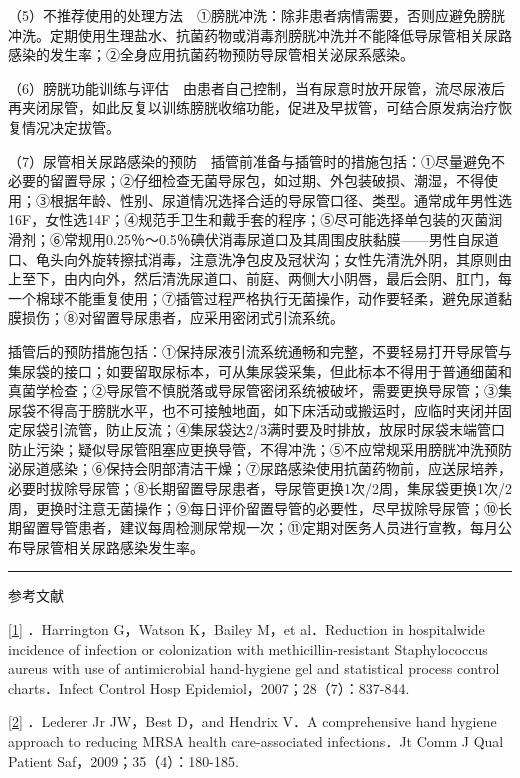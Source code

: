 （5）不推荐使用的处理方法　①膀胱冲洗：除非患者病情需要，否则应避免膀胱冲洗。定期使用生理盐水、抗菌药物或消毒剂膀胱冲洗并不能降低导尿管相关尿路感染的发生率；②全身应用抗菌药物预防导尿管相关泌尿系感染。

（6）膀胱功能训练与评估　由患者自己控制，当有尿意时放开尿管，流尽尿液后再夹闭尿管，如此反复以训练膀胱收缩功能，促进及早拔管，可结合原发病治疗恢复情况决定拔管。

（7）尿管相关尿路感染的预防　插管前准备与插管时的措施包括：①尽量避免不必要的留置导尿；②仔细检查无菌导尿包，如过期、外包装破损、潮湿，不得使用；③根据年龄、性别、尿道情况选择合适的导尿管口径、类型。通常成年男性选16F，女性选14F；④规范手卫生和戴手套的程序；⑤尽可能选择单包装的灭菌润滑剂；⑥常规用0.25％～0.5％碘伏消毒尿道口及其周围皮肤黏膜------男性自尿道口、龟头向外旋转擦拭消毒，注意洗净包皮及冠状沟；女性先清洗外阴，其原则由上至下，由内向外，然后清洗尿道口、前庭、两侧大小阴唇，最后会阴、肛门，每一个棉球不能重复使用；⑦插管过程严格执行无菌操作，动作要轻柔，避免尿道黏膜损伤；⑧对留置导尿患者，应采用密闭式引流系统。

插管后的预防措施包括：①保持尿液引流系统通畅和完整，不要轻易打开导尿管与集尿袋的接口；如要留取尿标本，可从集尿袋采集，但此标本不得用于普通细菌和真菌学检查；②导尿管不慎脱落或导尿管密闭系统被破坏，需要更换导尿管；③集尿袋不得高于膀胱水平，也不可接触地面，如下床活动或搬运时，应临时夹闭并固定尿袋引流管，防止反流；④集尿袋达2/3满时要及时排放，放尿时尿袋末端管口防止污染；疑似导尿管阻塞应更换导管，不得冲洗；⑤不应常规采用膀胱冲洗预防泌尿道感染；⑥保持会阴部清洁干燥；⑦尿路感染使用抗菌药物前，应送尿培养，必要时拔除导尿管；⑧长期留置导尿患者，导尿管更换1次/2周，集尿袋更换1次/2周，更换时注意无菌操作；⑨每日评价留置导管的必要性，尽早拔除导尿管；⑩长期留置导管患者，建议每周检测尿常规一次；⑪定期对医务人员进行宣教，每月公布导尿管相关尿路感染发生率。

\begin{center}\rule{0.5\linewidth}{\linethickness}\end{center}

参考文献

\protect\hyperlink{text00031.htmlux5cux23ch1-30-back}{{[}1{]}}
．Harrington G，Watson K，Bailey M，et al．Reduction in hospitalwide
incidence of infection or colonization with methicillin-resistant
Staphylococcus aureus with use of antimicrobial hand-hygiene gel and
statistical process control charts．Infect Control Hosp
Epidemiol，2007；28（7）：837-844.

\protect\hyperlink{text00031.htmlux5cux23ch2-30-back}{{[}2{]}} ．Lederer
Jr JW，Best D，and Hendrix V．A comprehensive hand hygiene approach to
reducing MRSA health care-associated infections．Jt Comm J Qual Patient
Saf，2009；35（4）：180-185.

